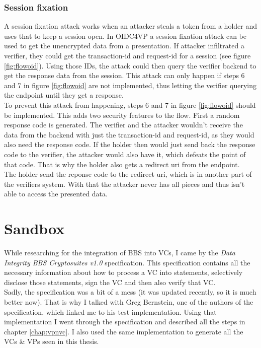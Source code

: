 \documentclass[
	a4paper               %
	,BCOR=0mm            %
	,bibliography=totoc   %
	,listof=totoc         %
	,monolingual
	,twoside=false
]{bfhthesis}              %
\begin{document}
\subsection{Session fixation}
A session fixation attack works when an attacker steals a token from a holder and uses that to keep a session open.
In OIDC4VP a session fixation attack can be used to get the unencrypted data from a presentation.
If attacker infiltrated a verifier, they could get the transaction-id and request-id for a session (see figure \ref{fig:flowoid}).
Using those IDs, the attack could then query the verifier backend to get the response data from the session.
This attack can only happen if steps 6 and 7 in figure \ref{fig:flowoid} are not implemented, thus letting the verifier querying the endpoint until they get a response.\\
To prevent this attack from happening, steps 6 and 7 in figure \ref{fig:flowoid} should be implemented. This adds two security features to the flow.
First a random response code is generated. The verifier and the attacker wouldn't receive the data from the backend with just the transaction-id and request-id, as they would also need the response code. 
If the holder then would just send back the response code to the verifier, the attacker would also have it, which defeats the point of that code. That is why the holder also gets a redirect uri from the endpoint.\\
The holder send the reponse code to the redirect uri, which is in another part of the verifiers system. With that the attacker never has all pieces and thus isn't able to access the presented data.


\chapter{Sandbox}
While researching for the integration of BBS into VCs, I came by the \textit{Data Integrity BBS Cryptosuites v1.0}\cite{bbsvc} specification.
This specification contains all the necessary information about how to process a VC into statements, selectively disclose those statements, sign the VC and then also verify that VC.\\
Sadly, the specification was a bit of a mess (it was updated recently, so it is much better now). That is why I talked with Greg Bernstein, one of the authors of the specification, which linked me to his test implementation. Using that implementation I went through the specification and described all the steps in chapter \ref{chap:vpnvc}. I also used the same implementation to generate all the VCs \& VPs seen in this thesis.\\
\end{document}
